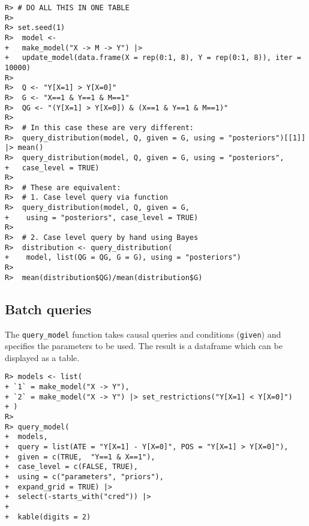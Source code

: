 \documentclass[
  11pt,
  article]{jss}
\begin{document}
\begin{verbatim}
R> # DO ALL THIS IN ONE TABLE
R> 
R> set.seed(1)
R>  model <-
+   make_model("X -> M -> Y") |>
+   update_model(data.frame(X = rep(0:1, 8), Y = rep(0:1, 8)), iter = 10000)
R> 
R>  Q <- "Y[X=1] > Y[X=0]"
R>  G <- "X==1 & Y==1 & M==1"
R>  QG <- "(Y[X=1] > Y[X=0]) & (X==1 & Y==1 & M==1)"
R> 
R>  # In this case these are very different:
R>  query_distribution(model, Q, given = G, using = "posteriors")[[1]] |> mean()
R>  query_distribution(model, Q, given = G, using = "posteriors",
+   case_level = TRUE)
R> 
R>  # These are equivalent:
R>  # 1. Case level query via function
R>  query_distribution(model, Q, given = G,
+    using = "posteriors", case_level = TRUE)
R> 
R>  # 2. Case level query by hand using Bayes
R>  distribution <- query_distribution(
+    model, list(QG = QG, G = G), using = "posteriors")
R> 
R>  mean(distribution$QG)/mean(distribution$G)
\end{verbatim}

\hypertarget{batch-queries}{%
\subsection{Batch queries}\label{batch-queries}}

The \texttt{query\_model} function takes causal queries and conditions
(\texttt{given}) and specifies the parameters to be used. The result is
a dataframe which can be displayed as a table.

\begin{verbatim}
R> models <- list(
+ `1` = make_model("X -> Y"),
+ `2` = make_model("X -> Y") |> set_restrictions("Y[X=1] < Y[X=0]")
+ )
R> 
R> query_model(
+  models,
+  query = list(ATE = "Y[X=1] - Y[X=0]", POS = "Y[X=1] > Y[X=0]"),
+  given = c(TRUE,  "Y==1 & X==1"),
+  case_level = c(FALSE, TRUE),
+  using = c("parameters", "priors"),
+  expand_grid = TRUE) |>
+  select(-starts_with("cred")) |>
+  
+  kable(digits = 2)
\end{verbatim}
\end{document}
